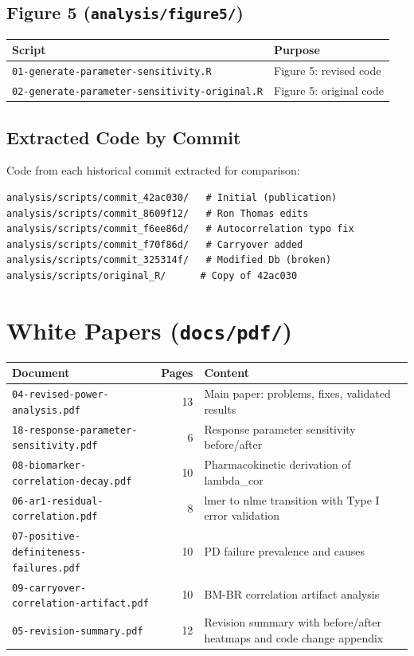 \documentclass[11pt]{article}
\begin{document}
\subsection{Figure 5 (\texttt{analysis/figure5/})}

\begin{table}[h]
\centering
\begin{tabular}{ll}
\toprule
Script & Purpose \\
\midrule
\texttt{01-generate-parameter-sensitivity.R} & Figure 5: revised code \\
\texttt{02-generate-parameter-sensitivity-original.R} & Figure 5: original code \\
\bottomrule
\end{tabular}
\end{table}

\subsection{Extracted Code by Commit}

Code from each historical commit extracted for comparison:

\begin{verbatim}
analysis/scripts/commit_42ac030/   # Initial (publication)
analysis/scripts/commit_8609f12/   # Ron Thomas edits
analysis/scripts/commit_f6ee86d/   # Autocorrelation typo fix
analysis/scripts/commit_f70f86d/   # Carryover added
analysis/scripts/commit_325314f/   # Modified Db (broken)
analysis/scripts/original_R/      # Copy of 42ac030
\end{verbatim}

\section{White Papers (\texttt{docs/pdf/})}

\begin{table}[h]
\centering
\begin{tabular}{lrl}
\toprule
Document & Pages & Content \\
\midrule
\texttt{04-revised-power-analysis.pdf} & 13 & Main paper: problems, fixes, validated results \\
\texttt{18-response-parameter-sensitivity.pdf} & 6 & Response parameter sensitivity before/after \\
\texttt{08-biomarker-correlation-decay.pdf} & 10 & Pharmacokinetic derivation of lambda\_cor \\
\texttt{06-ar1-residual-correlation.pdf} & 8 & lmer to nlme transition with Type I error validation \\
\texttt{07-positive-definiteness-failures.pdf} & 10 & PD failure prevalence and causes \\
\texttt{09-carryover-correlation-artifact.pdf} & 10 & BM-BR correlation artifact analysis \\
\texttt{05-revision-summary.pdf} & 12 & Revision summary with before/after heatmaps and code change appendix \\
\bottomrule
\end{tabular}
\end{table}
\end{document}
